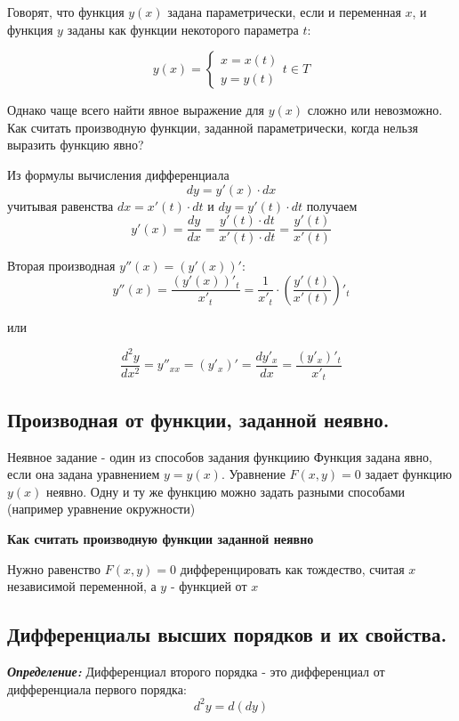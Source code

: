 \documentclass[a4paper,12pt]{article}
\theoremstyle{plain} %
\theoremstyle{definition} %
\theoremstyle{remark} %
\begin{document}
Говорят, что функция $y(x)$ задана параметрически, если и переменная $x$, и функция $y$ заданы как функции некоторого параметра $t$:

\[
	y(x) =
	\begin{cases}
		x = x(t) \\
		y = y(t)
	\end{cases} t\in T
\]

Однако чаще всего найти явное выражение для $y(x)$ сложно или невозможно. Как считать производную функции, заданной параметрически, когда нельзя выразить функцию явно?

Из формулы вычисления дифференциала \[ dy = y'(x) \cdot dx \] учитывая равенства $ dx = x'(t) \cdot dt $ и $ dy = y'(t) \cdot dt $ получаем \[ y'(x) = \frac{dy}{dx} = \frac{y'(t) \cdot dt}{x'(t) \cdot dt} = \frac{y'(t)}{x'(t)} \]

Вторая производная $y''(x) = (y'(x))'$:
\[
	y''(x) = \frac{(y'(x))'_t}{x'_t} = \frac{1}{x'_t} \cdot \left( \frac{y'(t)}{x'(t)} \right)'_t
\]

или

\[
	\frac{d^2y}{dx^2} = y''_{xx} = (y'_x)' = \frac{dy'_x}{dx} = \frac{(y'_x)'_t}{x'_t}
\]

\newpage
\subsection*{Производная от функции, заданной неявно.                                                   }

Неявное задание - один из способов задания функциию Функция задана явно, если она задана уравнением $y = y(x)$. Уравнение $F(x, y) = 0$ задает функцию $y(x)$ неявно. Одну и ту же функцию можно задать разными способами (например уравнение окружности)

\textbf{Как считать производную функции заданной неявно}

Нужно равенство $F(x, y) = 0$ дифференцировать как тождество, считая $x$ независимой переменной, а $y$ - функцией от $x$



\newpage
\subsection*{Дифференциалы высших порядков и их свойства.                                               }
\textit{\textbf{Определение:}} Дифференциал второго порядка - это дифференциал от дифференциала первого порядка:
\[
	d^2y = d(dy)
\]
\end{document}
